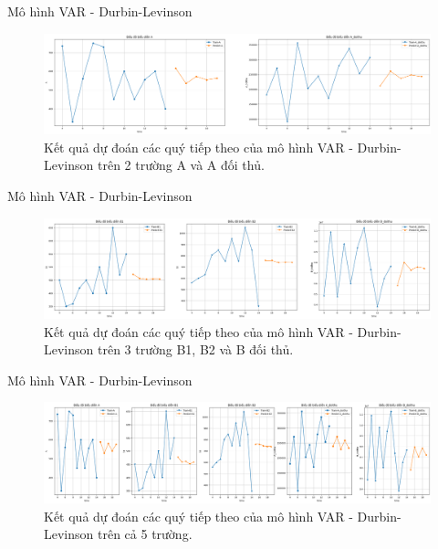 \begin{frame}{Mô hình VAR - Durbin-Levinson}
    \begin{figure}[H]
    \centering
    \includegraphics[width = \textwidth]{figure/preDB2.png}
     \caption{Kết quả dự đoán các quý tiếp theo của mô hình VAR - Durbin-Levinson trên 2 trường A và A đối thủ.}
\end{figure}
\end{frame}

\begin{frame}{Mô hình VAR - Durbin-Levinson}
    \begin{figure}[H]
    \centering
    \includegraphics[width = \textwidth]{figure/preDB3.png}
     \caption{Kết quả dự đoán các quý tiếp theo của mô hình VAR - Durbin-Levinson trên 3 trường B1, B2 và B đối thủ.}
\end{figure}
\end{frame}

\begin{frame}{Mô hình VAR - Durbin-Levinson}
    \begin{figure}[H]
    \centering
    \includegraphics[width = \textwidth]{figure/preDB5.png}
     \caption{Kết quả dự đoán các quý tiếp theo của mô hình VAR - Durbin-Levinson trên cả 5 trường.}
\end{figure}
\end{frame}

